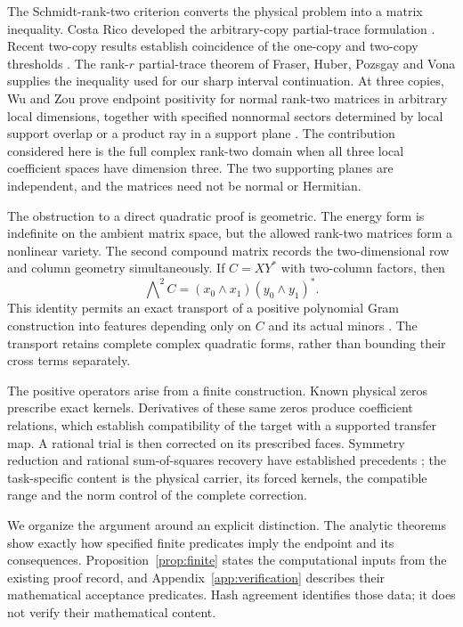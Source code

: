 \documentclass[11pt,a4paper]{article}
\theoremstyle{definition}\newtheorem{definition}[theorem]{Definition}
\theoremstyle{remark}\newtheorem{remark}[theorem]{Remark}
\numberwithin{equation}{section}
\begin{document}
The Schmidt-rank-two criterion converts the physical problem into a
matrix inequality. Costa Rico developed the arbitrary-copy partial-trace
formulation \cite{costa}. Recent two-copy results establish coincidence
of the one-copy and two-copy thresholds \cite{fu,song,fraser,bharti}.
The rank-$r$ partial-trace theorem of Fraser, Huber, Pozsgay and Vona
\cite{fraser} supplies the inequality used for our sharp interval
continuation. At three copies, Wu and Zou prove endpoint positivity
for normal rank-two matrices in arbitrary local dimensions, together
with specified nonnormal sectors determined by local support overlap
or a product ray in a support plane \cite{wuzou}.
The contribution considered here is the full complex rank-two domain
when all three local coefficient spaces have dimension three.
The two supporting planes are independent, and the matrices need
not be normal or Hermitian.

The obstruction to a direct quadratic proof is geometric.
The energy form is indefinite on the ambient matrix space, but the
allowed rank-two matrices form a nonlinear variety. The second compound
matrix records the two-dimensional row and column geometry simultaneously.
If $C=XY^*$ with two-column factors, then
\[
\bigwedge\nolimits^2C=(x_0\wedge x_1)(y_0\wedge y_1)^*.
\]
This identity permits an exact transport of a positive polynomial Gram
construction into features depending only on $C$ and its actual minors
\cite{compound}. The transport retains complete complex quadratic
forms, rather than bounding their cross terms separately.

The positive operators arise from a finite construction.
Known physical zeros prescribe exact kernels. Derivatives of these
same zeros produce coefficient relations, which establish compatibility
of the target with a supported transfer map. A rational trial is then
corrected on its prescribed faces. Symmetry reduction and rational
sum-of-squares recovery have established precedents
\cite{gatermann,peyrl}; the task-specific content is the physical
carrier, its forced kernels, the compatible range and the norm control
of the complete correction.

We organize the argument around an explicit distinction.
The analytic theorems show exactly how specified finite predicates
imply the endpoint and its consequences. Proposition~\ref{prop:finite}
states the computational inputs from the existing proof record, and
Appendix~\ref{app:verification} describes their mathematical acceptance
predicates. Hash agreement identifies those data; it does not verify
their mathematical content.
\end{document}
